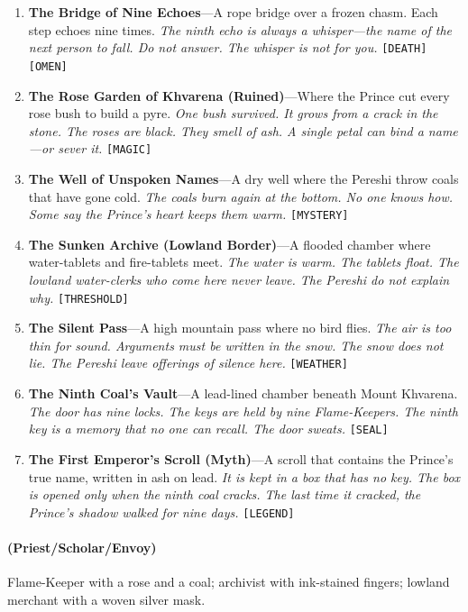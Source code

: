 \begin{enumerate}
\item \textbf{The Bridge of Nine Echoes}---A rope bridge over a frozen chasm. Each step echoes nine times.
  \hfill \textit{The ninth echo is always a whisper---the name of the next person to fall. Do not answer. The whisper is not for you.} \texttt{[DEATH]} \texttt{[OMEN]}
\item \textbf{The Rose Garden of Khvarena (Ruined)}---Where the Prince cut every rose bush to build a pyre.
  \hfill \textit{One bush survived. It grows from a crack in the stone. The roses are black. They smell of ash. A single petal can bind a name---or sever it.} \texttt{[MAGIC]}
\item \textbf{The Well of Unspoken Names}---A dry well where the Pereshi throw coals that have gone cold.
  \hfill \textit{The coals burn again at the bottom. No one knows how. Some say the Prince's heart keeps them warm.} \texttt{[MYSTERY]}
\item[J] \textbf{The Sunken Archive (Lowland Border)}---A flooded chamber where water-tablets and fire-tablets meet.
  \hfill \textit{The water is warm. The tablets float. The lowland water-clerks who come here never leave. The Pereshi do not explain why.} \texttt{[THRESHOLD]}
\item[Q] \textbf{The Silent Pass}---A high mountain pass where no bird flies.
  \hfill \textit{The air is too thin for sound. Arguments must be written in the snow. The snow does not lie. The Pereshi leave offerings of silence here.} \texttt{[WEATHER]}
\item[K] \textbf{The Ninth Coal's Vault}---A lead-lined chamber beneath Mount Khvarena.
  \hfill \textit{The door has nine locks. The keys are held by nine Flame-Keepers. The ninth key is a memory that no one can recall. The door sweats.} \texttt{[SEAL]}
\item[A] \textbf{The First Emperor's Scroll (Myth)}---A scroll that contains the Prince's true name, written in ash on lead.
  \hfill \textit{It is kept in a box that has no key. The box is opened only when the ninth coal cracks. The last time it cracked, the Prince's shadow walked for nine days.} \texttt{[LEGEND]}
\end{enumerate}

\paragraph*{(Priest/Scholar/Envoy)} Flame-Keeper with a rose and a coal; archivist with ink-stained fingers; lowland merchant with a woven silver mask.

